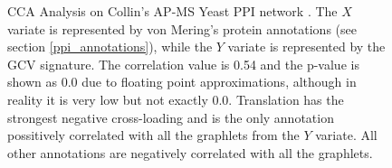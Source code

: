 \begin{figure}[H]
\begin{tabular}{ c c | c c }
\end{tabular}
\caption[CCA Analysis on Collin's AP-MS Yeast PPI network -- von Mering's annotations]{CCA Analysis on Collin's AP-MS Yeast PPI network \cite{collins2007toward}. The $X$ variate is represented by von Mering's protein annotations (see section \ref{ppi_annotations}), while the $Y$ variate is represented by the GCV signature. The correlation value is 0.54 and the p-value is shown as 0.0 due to floating point approximations, although in reality it is very low but not exactly 0.0. Translation has the strongest negative cross-loading and is the only annotation possitively correlated with all the graphlets from the $Y$ variate. All other annotations are negatively correlated with all the graphlets.}
\label{all_ppi12}
\end{figure}




